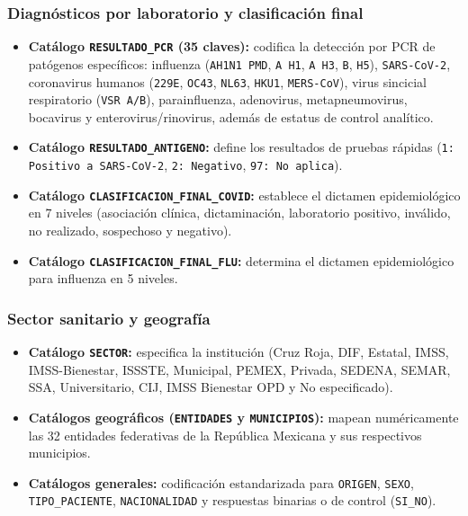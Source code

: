 \subsubsection{Diagnósticos por laboratorio y clasificación final}

\begin{itemize}
    \item \textbf{Catálogo \texttt{RESULTADO\_PCR} (35 claves):} codifica la detección por PCR de patógenos específicos: influenza (\texttt{AH1N1 PMD}, \texttt{A H1}, \texttt{A H3}, \texttt{B}, \texttt{H5}), \texttt{SARS-CoV-2}, coronavirus humanos (\texttt{229E}, \texttt{OC43}, \texttt{NL63}, \texttt{HKU1}, \texttt{MERS-CoV}), virus sincicial respiratorio (\texttt{VSR A/B}), parainfluenza, adenovirus, metapneumovirus, bocavirus y enterovirus/rinovirus, además de estatus de control analítico.
    \item \textbf{Catálogo \texttt{RESULTADO\_ANTIGENO}:} define los resultados de pruebas rápidas (\texttt{1: Positivo a SARS-CoV-2}, \texttt{2: Negativo}, \texttt{97: No aplica}).
    \item \textbf{Catálogo \texttt{CLASIFICACION\_FINAL\_COVID}:} establece el dictamen epidemiológico en 7 niveles (asociación clínica, dictaminación, laboratorio positivo, inválido, no realizado, sospechoso y negativo).
    \item \textbf{Catálogo \texttt{CLASIFICACION\_FINAL\_FLU}:} determina el dictamen epidemiológico para influenza en 5 niveles.
\end{itemize}

\subsubsection{Sector sanitario y geografía}

\begin{itemize}
    \item \textbf{Catálogo \texttt{SECTOR}:} especifica la institución (Cruz Roja, DIF, Estatal, IMSS, IMSS-Bienestar, ISSSTE, Municipal, PEMEX, Privada, SEDENA, SEMAR, SSA, Universitario, CIJ, IMSS Bienestar OPD y No especificado).
    \item \textbf{Catálogos geográficos (\texttt{ENTIDADES} y \texttt{MUNICIPIOS}):} mapean numéricamente las 32 entidades federativas de la República Mexicana y sus respectivos municipios.
    \item \textbf{Catálogos generales:} codificación estandarizada para \texttt{ORIGEN}, \texttt{SEXO}, \texttt{TIPO\_PACIENTE}, \texttt{NACIONALIDAD} y respuestas binarias o de control (\texttt{SI\_NO}).
\end{itemize}

